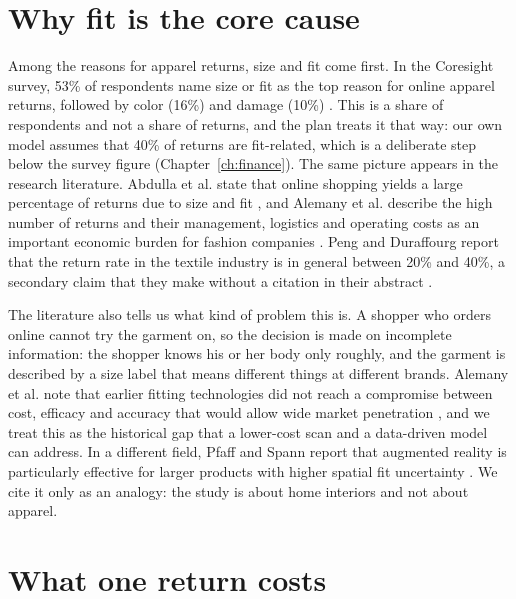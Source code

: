 \section{Why fit is the core cause}\label{sec:fit-cause}

Among the reasons for apparel returns, size and fit come first. In the Coresight survey, 53\% of respondents name size or fit as the top reason for online apparel returns, followed by color (16\%) and damage (10\%) \cite{coresight2023}. This is a share of respondents and not a share of returns, and the plan treats it that way: our own model assumes that 40\% of returns are fit-related, which is a deliberate step below the survey figure (Chapter~\ref{ch:finance}). The same picture appears in the research literature. Abdulla et al. state that online shopping yields a large percentage of returns due to size and fit \cite{abdulla2019}, and Alemany et al. describe the high number of returns and their management, logistics and operating costs as an important economic burden for fashion companies \cite{alemany2013}. Peng and Duraffourg report that the return rate in the textile industry is in general between 20\% and 40\%, a secondary claim that they make without a citation in their abstract \cite{peng2023}.

The literature also tells us what kind of problem this is. A shopper who orders online cannot try the garment on, so the decision is made on incomplete information: the shopper knows his or her body only roughly, and the garment is described by a size label that means different things at different brands. Alemany et al. note that earlier fitting technologies did not reach a compromise between cost, efficacy and accuracy that would allow wide market penetration \cite{alemany2013}, and we treat this as the historical gap that a lower-cost scan and a data-driven model can address. In a different field, Pfaff and Spann report that augmented reality is particularly effective for larger products with higher spatial fit uncertainty \cite{pfaff2025}. We cite it only as an analogy: the study is about home interiors and not about apparel.

\section{What one return costs}\label{sec:return-cost}

